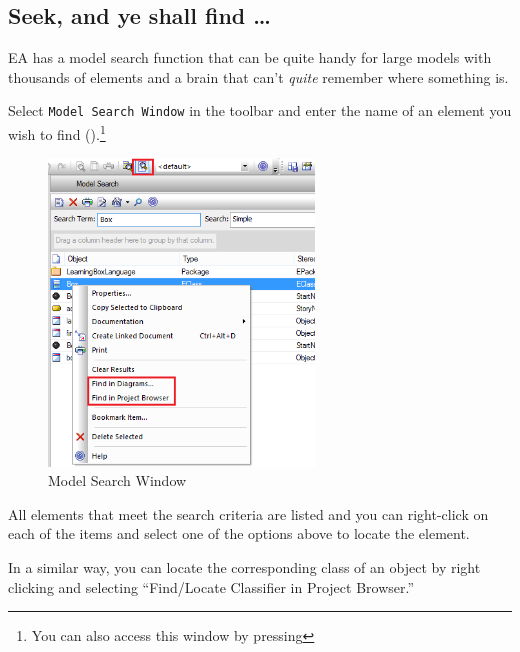 \newpage

\hypertarget{subsec:seekAndFind}{}

\subsection{Seek, and ye shall find \ldots}

EA has a model search function that can be quite handy for large models with thousands of elements and a brain that can't \emph{quite} remember where something
is.

\begin{stepbystep}

\item Select \texttt{Model Search Window} in the toolbar and enter the name of an element you wish to find
().\footnote{You can also access this window by pressing
}

\vspace{0.5cm}

\begin{figure}[htbp]
\begin{center}
  \includegraphics[width=0.63\textwidth]{../../org.moflon.doc.handbook.05_miscellaneous/1_grokkingEA/07_seek/search1}
  \caption{Model Search Window}  
  \label{fig_search01}
\end{center}
\end{figure}

\item All elements that meet the search criteria are listed and you can right-click on each of the items and select one of the options
above to locate the element.

\item In a similar way, you can locate the corresponding class of an object by right clicking and selecting ``Find/Locate Classifier in
Project Browser.''

\vfill

\end{stepbystep}
